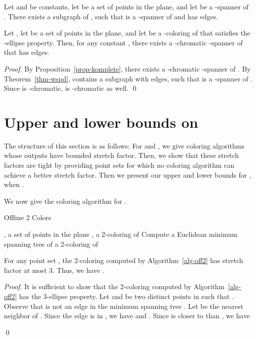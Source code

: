 \documentclass[pdftex,leqno,fleqn,12pts]{llncs}
\begin{document}
\begin{theorem}  \cite{glns-adogg-02}  \label{thm-wspd} 
Let  and  be constants, let  be a set of  
points in the plane, and let  be a -spanner of . There exists 
a subgraph  of , such that  is a -spanner 
of  and  has  edges.
\end{theorem}

\begin{proposition} 
\label{prop-gudm}
Let , let  be a set of  points in the plane, and let 
 be a -coloring of  that satisfies 
the -ellipse property. Then, for any constant , there 
exists a -chromatic -spanner of  that has 
 edges. 
\end{proposition}
\begin{proof} 
By Proposition~\ref{prop-komplete}, there exists a -chromatic 
-spanner  of . By Theorem~\ref{thm-wspd},  contains a 
subgraph  with  edges, such that  is a 
-spanner of . Since  is -chromatic, 
 is -chromatic as well. 
\qed  
\end{proof}


\section{Upper and lower bounds on }
\label{section-offline}

The structure of this section is as follows: For  and , we 
give coloring algorithms whose outputs have bounded stretch factor. 
Then, we show that these stretch factors are tight by providing point 
sets for which no coloring algorithm can achieve a better stretch 
factor. Then we present our upper and lower bounds for , when . 

We now give the coloring algorithm for .

\begin{algorithm}
\caption{Offline 2 Colors}\label{alg-off2}
\begin{algorithmic}[1]
\REQUIRE , a set of points in the plane 
\ENSURE , a 2-coloring of  
\STATE Compute a Euclidean minimum spanning tree  of 
\STATE  a 2-coloring of 
\end{algorithmic}
\end{algorithm}



\begin{lemma}  \label{prop-ub2off}
For any point set , the 2-coloring computed by 
Algorithm~\ref{alg-off2} has stretch factor at most 3. Thus, we have 
.
\end{lemma}
\begin{proof} 
It is sufficient to show that the 2-coloring  computed by
Algorithm~\ref{alg-off2} has the 3-ellipse property. 
Let  and  be two distinct points in  such that .  
Observe that  is not an edge in the minimum spanning tree . 
Let  be the nearest neighbor of . Since the edge  is in 
, we have  and . Since  is closer to  
than , we have 
 
\qed 
\end{proof}
\end{document}

